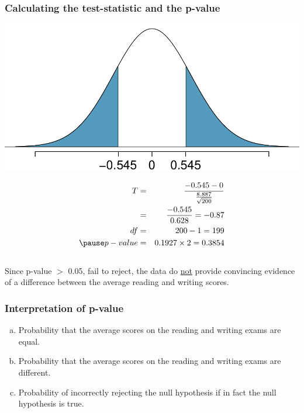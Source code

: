 \documentclass[notes,11pt, aspectratio=169]{beamer}
\begin{document}
\begin{frame}[shrink]
\frametitle{Calculating the test-statistic and the p-value}


{
\begin{center}
\includegraphics[width=\textwidth]{graphs/hsb2_read_write_pval}
\end{center}
}
{
\pause
\begin{eqnarray*}
T &=& \frac{-0.545 - 0}{\frac{8.887}{\sqrt{200}}} \\
&=& \frac{-0.545}{0.628} = -0.87 \\
df &=& 200 - 1 = 199 \\
\pause
p-value &=& 0.1927 \times 2 = 0.3854
\end{eqnarray*}
}
\pause 
$\:$ \\
Since p-value $>$ 0.05, fail to reject, the data do \underline{not} provide convincing evidence of a difference between the average reading and writing scores.

\end{frame}


\begin{frame}
\frametitle{Interpretation of p-value}


\begin{enumerate}[(a)]
\item Probability that the average scores on the reading and writing exams are equal.
\item Probability that the average scores on the reading and writing exams are different.
\item Probability of incorrectly rejecting the null hypothesis if in fact the null hypothesis is true.
\end{enumerate}

\end{frame}
\end{document}
